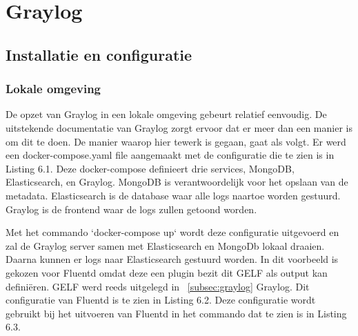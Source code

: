 
\chapter{Graylog}
\label{ch:graylog}

\section{Installatie en configuratie}

\subsection{Lokale omgeving}
De opzet van Graylog in een lokale omgeving gebeurt relatief eenvoudig. De uitstekende documentatie van Graylog zorgt ervoor dat er meer dan een manier is om dit te doen. De manier waarop hier tewerk is gegaan, gaat als volgt. Er werd een docker-compose.yaml file aangemaakt met de configuratie die te zien is in Listing 6.1. Deze docker-compose definieert drie services, MongoDB, Elasticsearch, en Graylog. MongoDB is verantwoordelijk voor het opslaan van de metadata. Elasticsearch is de database waar alle logs naartoe worden gestuurd. Graylog is de frontend waar de logs zullen getoond worden.

Met het commando `docker-compose up` wordt deze configuratie uitgevoerd en zal de Graylog server samen met Elasticsearch en MongoDb lokaal draaien. Daarna kunnen er logs naar Elasticsearch gestuurd worden. In dit voorbeeld is gekozen voor Fluentd omdat deze een plugin bezit dit GELF als output kan definiëren. GELF werd reeds uitgelegd in ~\ref{subsec:graylog} Graylog. Dit configuratie van Fluentd is te zien in Listing 6.2. Deze configuratie wordt gebruikt bij het uitvoeren van Fluentd in het commando dat te zien is in Listing 6.3.

